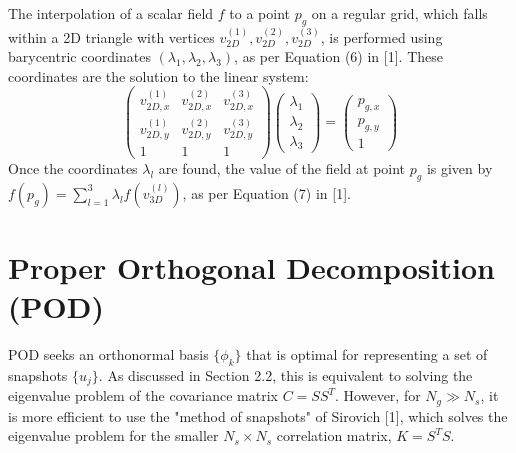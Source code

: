 \documentclass[dsc, EN]{ufabcFHZh}
\begin{document}
{The interpolation of a scalar field $f$ to a point $p_g$ on a regular grid, which falls within a 2D triangle with vertices $v_{2D}^{(1)}, v_{2D}^{(2)}, v_{2D}^{(3)}$, is performed using barycentric coordinates $(\lambda_1, \lambda_2, \lambda_3)$, as per Equation (6) in {[1]}. These coordinates are the solution to the linear system:
\begin{equation}
\begin{pmatrix} v_{2D,x}^{(1)} & v_{2D,x}^{(2)} & v_{2D,x}^{(3)} \\ v_{2D,y}^{(1)} & v_{2D,y}^{(2)} & v_{2D,y}^{(3)} \\ 1 & 1 & 1 \end{pmatrix} \begin{pmatrix} \lambda_1 \\ \lambda_2 \\ \lambda_3 \end{pmatrix} = \begin{pmatrix} p_{g,x} \\ p_{g,y} \\ 1 \end{pmatrix}
\end{equation}
Once the coordinates $\lambda_l$ are found, the value of the field at point $p_g$ is given by $f(p_g) = \sum_{l=1}^{3} \lambda_l f(v_{3D}^{(l)})$, as per Equation (7) in {[1]}.

\section{Proper Orthogonal Decomposition (POD)}
\label{sec:pod_derivation}

POD seeks an orthonormal basis $\{\phi_k\}$ that is optimal for representing a set of snapshots $\{u_j\}$. As discussed in Section 2.2, this is equivalent to solving the eigenvalue problem of the covariance matrix $C = SS^T$. However, for $N_g \gg N_s$, it is more efficient to use the "method of snapshots" of Sirovich {[1]}, which solves the eigenvalue problem for the smaller $N_s \times N_s$ correlation matrix, $K = S^T S$.

}
\end{document}
